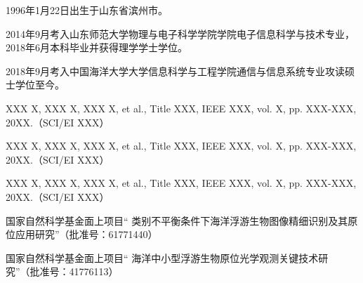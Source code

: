 \begin{resume}


  1996年1月22日出生于山东省滨州市。

  2014年9月考入山东师范大学物理与电子科学学院学院电子信息科学与技术专业，2018年6月本科毕业并获得理学学士学位。
  
  2018年9月考入中国海洋大学大学信息科学与工程学院通信与信息系统专业攻读硕士学位至今。


  \begin{publications}
    \item XXX X, XXX X, XXX X, et al., Title XXX, IEEE XXX, vol. X, pp. XXX-XXX, 20XX.（SCI/EI XXX）
  \end{publications}

  \begin{publications}[before=\publicationskip,after=\publicationskip]
    \item XXX X, XXX X, XXX X, et al., Title XXX, IEEE XXX, vol. X, pp. XXX-XXX, 20XX.（SCI/EI XXX）
  \end{publications}

  \begin{publications}
    \item XXX X, XXX X, XXX X, et al., Title XXX, IEEE XXX, vol. X, pp. XXX-XXX, 20XX.（SCI/EI XXX）
  \end{publications}

  \begin{achievements}
    \item 国家自然科学基金面上项目“ 类别不平衡条件下海洋浮游生物图像精细识别及其原位应用研究”（批准号：61771440）
    \item 国家自然科学基金面上项目“ 海洋中小型浮游生物原位光学观测关键技术研究”（批准号：41776113）

  \end{achievements}

\end{resume}

